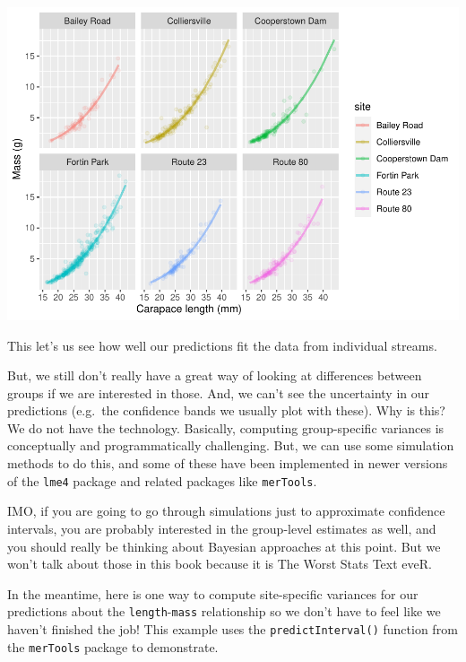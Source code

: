 \documentclass[
]{book}
\begin{document}
\includegraphics{worstr_files/figure-latex/unnamed-chunk-382-1.pdf}

This let's us see how well our predictions fit the data from individual streams.

But, we still don't really have a great way of looking at differences between groups if we are interested in those. And, we can't see the uncertainty in our predictions (e.g.~the confidence bands we usually plot with these). Why is this? We do not have the technology. Basically, computing group-specific variances is conceptually and programmatically challenging. But, we can use some simulation methods to do this, and some of these have been implemented in newer versions of the \texttt{lme4} package and related packages like \texttt{merTools}.

IMO, if you are going to go through simulations just to approximate confidence intervals, you are probably interested in the group-level estimates as well, and you should really be thinking about Bayesian approaches at this point. But we won't talk about those in this book because it is The Worst Stats Text eveR.

In the meantime, here is one way to compute site-specific variances for our predictions about the \texttt{length}-\texttt{mass} relationship so we don't have to feel like we haven't finished the job! This example uses the \texttt{predictInterval()} function from the \texttt{merTools} package to demonstrate.
\end{document}
